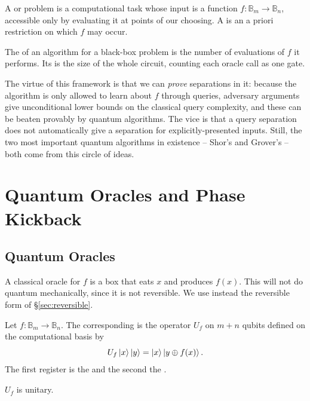 \documentclass[a4paper]{scrartcl}
\newcommand{\bits}[1]{\mathbb{B}_{#1}}
\begin{document}
\begin{definition}
	A  or  problem is a computational task whose input is a function $f:\bits m\to\bits n$, accessible only by evaluating it at points of our choosing. A  is an a priori restriction on which $f$ may occur.
\end{definition}

\begin{definition}
	The  of an algorithm for a black-box problem is the number of evaluations of $f$ it performs. Its  is the size of the whole circuit, counting each oracle call as one gate.
\end{definition}

The virtue of this framework is that we can \emph{prove} separations in it: because the algorithm is only allowed to learn about $f$ through queries, adversary arguments give unconditional lower bounds on the classical query complexity, and these can be beaten provably by quantum algorithms. The vice is that a query separation does not automatically give a separation for explicitly-presented inputs. Still, the two most important quantum algorithms in existence -- Shor's and Grover's -- both come from this circle of ideas.

\section{Quantum Oracles and Phase Kickback}

\subsection{Quantum Oracles}

A classical oracle for $f$ is a box that eats $x$ and produces $f(x)$. This will not do quantum mechanically, since it is not reversible. We use instead the reversible form of \S\ref{sec:reversible}.

\begin{definition}
	Let $f : \bits m\to\bits n$. The corresponding  is the operator $U_f$ on $m + n$ qubits defined on the computational basis by
	$$U_f\ket{x}\ket{y} = \ket{x}\ket{y\oplus f(x)}.$$
	The first register is the  and the second the .
\end{definition}

\begin{proposition}
	$U_f$ is unitary.
\end{proposition}
\end{document}
